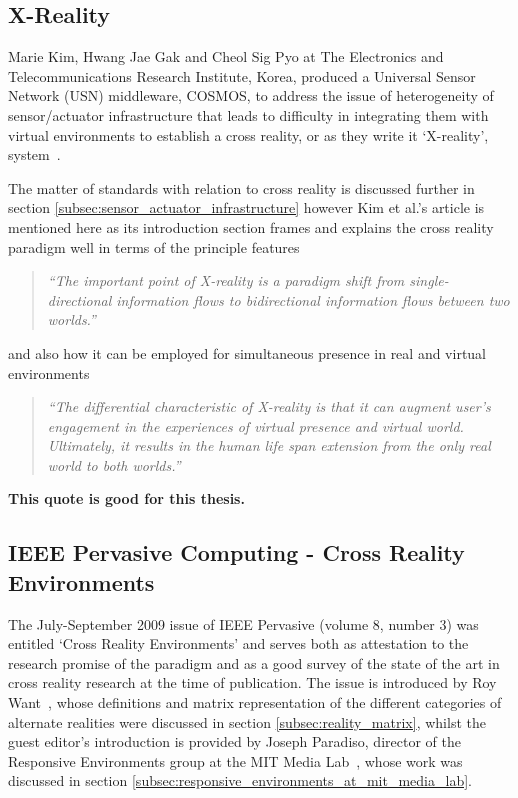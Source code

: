 \subsection{X-Reality}
\label{subsec:x-reality}
Marie Kim, Hwang Jae Gak and Cheol Sig Pyo at The Electronics and Telecommunications Research Institute, Korea, produced a Universal Sensor Network (USN) middleware, COSMOS, to address the issue of heterogeneity of sensor/actuator infrastructure that leads to difficulty in integrating them with virtual environments to establish a cross reality, or as they write it `X-reality', system~\cite{kim:practical}.

The matter of standards with relation to cross reality is discussed further in section \ref{subsec:sensor_actuator_infrastructure} however Kim et al.'s article is mentioned here as its introduction section frames and explains the cross reality paradigm well in terms of the principle features

\begin{quote}
\textit{``The important point of X-reality is a paradigm shift from single-directional information flows to bidirectional information flows between two worlds.''}
\end{quote}

and also how it can be employed for simultaneous presence in real and virtual environments

\begin{quote}
\textit{``The differential characteristic of X-reality is that it can augment user's engagement in the experiences of virtual presence and virtual world. Ultimately, it results in the human life span extension from the only real world to both worlds.''}
\end{quote}

\textbf{This quote is good for this thesis.}

\subsection{IEEE Pervasive Computing - Cross Reality Environments}
\label{subsec:ieee_pervasive_computing_-_cross_reality_environments}
The July-September 2009 issue of IEEE Pervasive (volume 8, number 3) was entitled `Cross Reality Environments' and serves both as attestation to the research promise of the paradigm and as a good survey of the state of the art in cross reality research at the time of publication. The issue is introduced by Roy Want~\cite{Want2009}, whose definitions and matrix representation of the different categories of alternate realities were discussed in section \ref{subsec:reality_matrix}, whilst the guest editor's introduction is provided by Joseph Paradiso, director of the Responsive Environments group at the MIT Media Lab~\cite{Paradiso2009}, whose work was discussed in section \ref{subsec:responsive_environments_at_mit_media_lab}.

